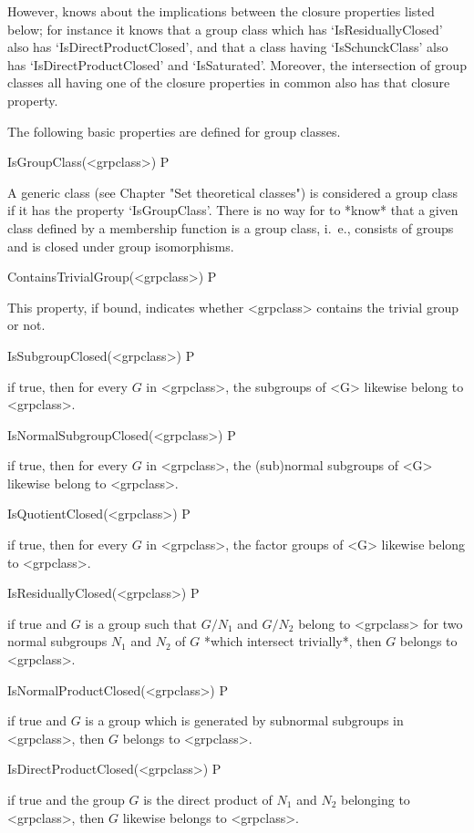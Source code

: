 However, {\CRISP}
knows about the implications between the closure properties listed below; for
instance it knows that a group class which has `IsResiduallyClosed' also has
`IsDirectProductClosed', and that a class having `IsSchunckClass' also has
`IsDirectProductClosed' and `IsSaturated'. Moreover, the intersection of
group classes all having one of the closure properties in common also has
that closure property.

The following
basic properties are defined for group classes.

\>IsGroupClass(<grpclass>) P

A generic class (see Chapter "Set theoretical classes") is considered a group
class if it has the property `IsGroupClass'. There is no way for {\CRISP} to
*know* that a given class defined by a membership function is a group class,
i.~e., consists of groups and is closed under group isomorphisms.

\> ContainsTrivialGroup(<grpclass>) P

This property, if bound, indicates whether <grpclass> contains the trivial group
or not.

\> IsSubgroupClosed(<grpclass>) P

if true, then for every $G$ in <grpclass>, the subgroups of <G> likewise
belong to <grpclass>.

\> IsNormalSubgroupClosed(<grpclass>) P

if true, then for every $G$ in <grpclass>, the (sub)normal subgroups of <G>
likewise belong to <grpclass>.

\> IsQuotientClosed(<grpclass>) P

if true, then for every $G$ in <grpclass>, the factor groups of <G>
likewise belong to <grpclass>.

\> IsResiduallyClosed(<grpclass>) P

if true and $G$ is a group such that $G/N_1$ and $G/N_2$ belong to
<grpclass> for two normal subgroups $N_1$ and $N_2$ of $G$ *which intersect
trivially*, then $G$ belongs to <grpclass>.

\> IsNormalProductClosed(<grpclass>) P

if true and $G$ is a group which is generated by subnormal subgroups in <grpclass>,
then $G$ belongs to <grpclass>.

\> IsDirectProductClosed(<grpclass>) P

if true and the group $G$ is the direct product of $N_1$ and
$N_2$ belonging to <grpclass>, then $G$ likewise belongs to
<grpclass>.

